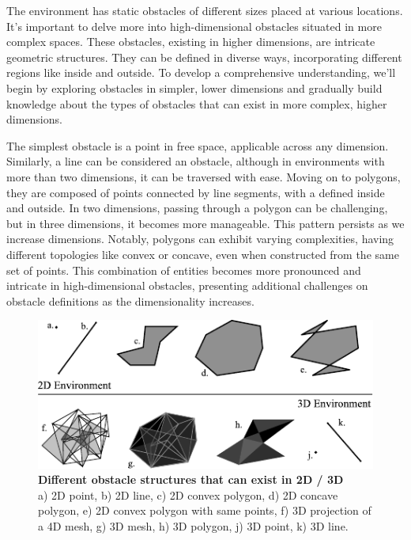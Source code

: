 \documentclass{IEEEtaes}
\begin{document}
{The environment has static obstacles of different sizes placed at various locations. It's important to delve more into high-dimensional obstacles situated in more complex spaces. These obstacles, existing in higher dimensions, are intricate geometric structures. They can be defined in diverse ways, incorporating different regions like inside and outside. To develop a comprehensive understanding, we'll begin by exploring obstacles in simpler, lower dimensions and gradually build knowledge about the types of obstacles that can exist in more complex, higher dimensions.

The simplest obstacle is a point in free space, applicable across any dimension. Similarly, a line can be considered an obstacle, although in environments with more than two dimensions, it can be traversed with ease. Moving on to polygons, they are composed of points connected by line segments, with a defined inside and outside. In two dimensions, passing through a polygon can be challenging, but in three dimensions, it becomes more manageable. This pattern persists as we increase dimensions. Notably, polygons can exhibit varying complexities, having different topologies like convex or concave, even when constructed from the same set of points. This combination of entities becomes more pronounced and intricate in high-dimensional obstacles, presenting additional challenges on obstacle definitions as the dimensionality increases.

\begin{figure}[b]
    \vspace{-1em}
    \begin{center}    
        \includegraphics[width=0.85\linewidth]{fig-1.pdf}
    \end{center}
     \caption{\textbf{Different obstacle structures that can exist in 2D / 3D} \\
     a) 2D point, b) 2D line, c) 2D convex polygon, d) 2D concave polygon, e) 2D convex polygon with same points, f) 3D projection of a 4D mesh, g) 3D mesh, h) 3D polygon, j) 3D point, k) 3D line.}
     \label{one}
\end{figure}

}
\end{document}
